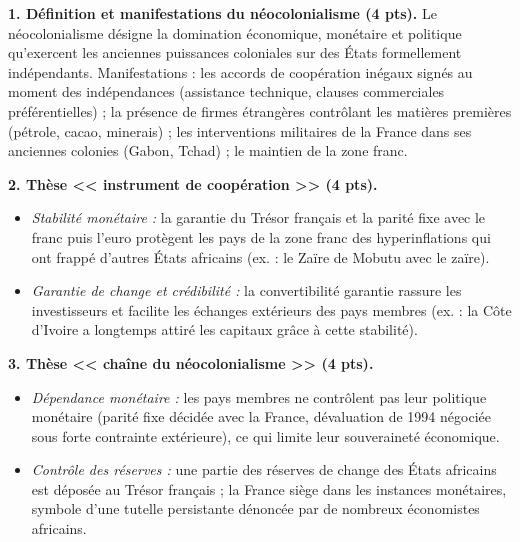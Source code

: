 \documentclass[11pt]{article}
\newcommand{\cle}[1]{{\popxbold\color{popdark}#1}}
\begin{document}
\begin{corrige}
\textbf{1. Définition et manifestations du néocolonialisme (4 pts).} Le \cle{néocolonialisme} désigne la domination économique, monétaire et politique qu'exercent les anciennes puissances coloniales sur des États formellement indépendants. Manifestations : les accords de coopération inégaux signés au moment des indépendances (assistance technique, clauses commerciales préférentielles) ; la présence de firmes étrangères contrôlant les matières premières (pétrole, cacao, minerais) ; les interventions militaires de la France dans ses anciennes colonies (Gabon, Tchad) ; le maintien de la zone franc.

\textbf{2. Thèse << instrument de coopération >> (4 pts).}
\begin{itemize}
\item \emph{Stabilité monétaire :} la garantie du Trésor français et la parité fixe avec le franc puis l'euro protègent les pays de la zone franc des hyperinflations qui ont frappé d'autres États africains (ex. : le Zaïre de Mobutu avec le zaïre).
\item \emph{Garantie de change et crédibilité :} la convertibilité garantie rassure les investisseurs et facilite les échanges extérieurs des pays membres (ex. : la Côte d'Ivoire a longtemps attiré les capitaux grâce à cette stabilité).
\end{itemize}

\textbf{3. Thèse << chaîne du néocolonialisme >> (4 pts).}
\begin{itemize}
\item \emph{Dépendance monétaire :} les pays membres ne contrôlent pas leur politique monétaire (parité fixe décidée avec la France, dévaluation de 1994 négociée sous forte contrainte extérieure), ce qui limite leur souveraineté économique.
\item \emph{Contrôle des réserves :} une partie des réserves de change des États africains est déposée au Trésor français ; la France siège dans les instances monétaires, symbole d'une tutelle persistante dénoncée par de nombreux économistes africains.
\end{itemize}


\end{corrige}
\end{document}
